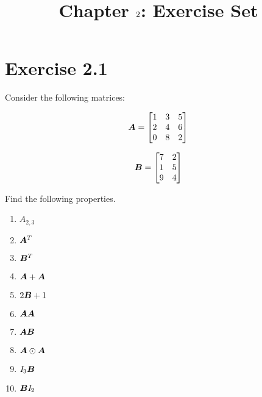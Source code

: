 \documentclass{article}
\author{}
\title{}
\date{\vspace{-5ex}}
\title{Chapter $\chapnumber$: Exercise Set}
\newcommand{\chapnumber}{2}
\begin{document}
\maketitle

\section*{Exercise \chapnumber.1}
Consider the following matrices:

\begin{equation}
{\bm{A}}
=
\begin{bmatrix}
    1 & 3 & 5 \\
    2 & 4 & 6 \\
    0 & 8 & 2 
\end{bmatrix}
\end{equation}

\begin{equation}
{\bm{B}}
=
\begin{bmatrix}
    7 & 2 \\
    1 & 5 \\
    9 & 4 
\end{bmatrix}
\end{equation}

Find the following properties.

\begin{enumerate}[label=(\alph*)]

\item $\textit{A}_{2,3}$
\item ${\bm{A}}^T$
\item ${\bm{B}}^T$
\item ${\bm{A}}+{\bm{A}}$
\item $2{\bm{B}}+1$
\item ${\bm{A}}{\bm{A}}$
\item ${\bm{A}}{\bm{B}}$
\item ${\bm{A}}\odot{\bm{A}}$
\item $\textit{I}_{3}{\bm{B}}$
\item ${\bm{B}}\textit{I}_{2}$

\end{enumerate} 
\end{document}
